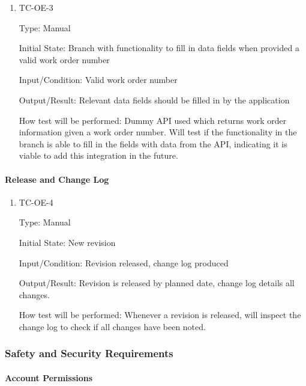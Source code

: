 \documentclass[12pt, titlepage]{article}
\begin{document}
\begin{enumerate}

  \item{TC-OE-3\\}

    Type: Manual

    Initial State: Branch with functionality to fill in data fields
    when provided a valid work order number

    Input/Condition: Valid work order number

    Output/Result: Relevant data fields should be filled in by
    the application

    How test will be performed: Dummy API used which returns work
    order information given a work order number. Will test if the
    functionality in the branch is able to fill in the fields with
    data from the API, indicating it is viable to add this
    integration in the future.

\end{enumerate}

\paragraph{Release and Change Log}

\begin{enumerate}

  \item{TC-OE-4\\}

    Type: Manual

    Initial State: New revision

    Input/Condition: Revision released, change log produced

    Output/Result: Revision is released by planned date, change log
    details all changes.

    How test will be performed: Whenever a revision is released, will
    inspect the change log to check if all changes have been noted.

\end{enumerate}

\subsubsection{Safety and Security Requirements}

\paragraph{Account Permissions}
\end{document}
